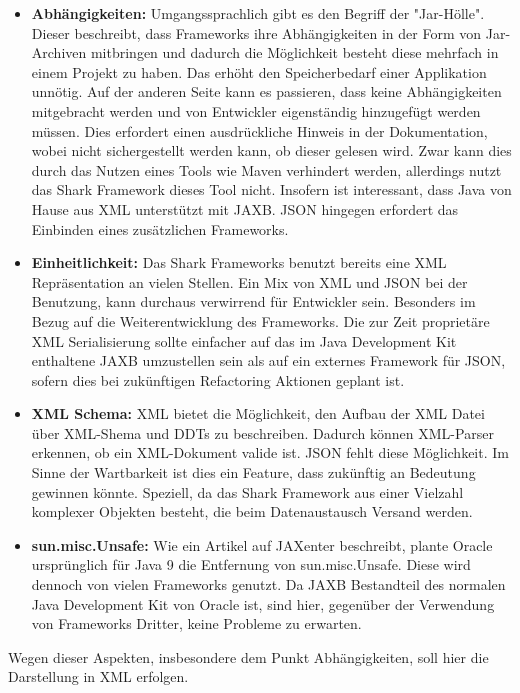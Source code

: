 \documentclass[a4paper]{article}
\begin{document}
	\begin{itemize}
		\item \textbf{Abhängigkeiten:} Umgangssprachlich gibt es den Begriff der
		"Jar-Hölle". Dieser beschreibt, dass Frameworks ihre Abhängigkeiten in der
		Form von Jar-Archiven mitbringen und dadurch die Möglichkeit besteht diese
		mehrfach in einem Projekt zu haben. Das erhöht den Speicherbedarf einer
		Applikation unnötig. Auf der anderen Seite kann es passieren, dass keine
		Abhängigkeiten mitgebracht werden und  von Entwickler eigenständig
		hinzugefügt werden müssen. Dies erfordert einen ausdrückliche Hinweis in
		der Dokumentation, wobei nicht sichergestellt werden kann, ob dieser
		gelesen	wird. Zwar kann dies durch das Nutzen eines Tools wie Maven
		verhindert werden, allerdings nutzt das Shark Framework dieses Tool nicht.
		Insofern ist interessant, dass Java von Hause aus XML unterstützt mit JAXB.
		JSON hingegen erfordert das Einbinden eines zusätzlichen Frameworks.
		\item \textbf{Einheitlichkeit:} Das Shark Frameworks benutzt bereits eine
		XML Repräsentation an vielen Stellen. Ein Mix von XML und JSON bei der
		Benutzung, kann durchaus verwirrend für Entwickler sein. Besonders
		im Bezug auf die Weiterentwicklung des Frameworks. Die zur Zeit proprietäre
		XML Serialisierung sollte einfacher auf das im Java Development Kit
		enthaltene JAXB umzustellen sein als auf ein externes Framework für JSON,
		sofern dies bei zukünftigen Refactoring Aktionen geplant ist.
		\item \textbf{XML Schema:} XML bietet die Möglichkeit, den
		Aufbau der XML Datei über XML-Shema und DDTs zu beschreiben. Dadurch
		können XML-Parser erkennen, ob ein XML-Dokument valide ist. JSON fehlt
		diese Möglichkeit. Im Sinne der Wartbarkeit ist dies ein Feature, dass
		zukünftig an Bedeutung gewinnen könnte. Speziell, da das Shark Framework
		aus einer Vielzahl komplexer Objekten besteht, die beim Datenaustausch
		Versand werden.
		\item \textbf{sun.misc.Unsafe:} Wie ein Artikel auf JAXenter \cite{unsafe}
		beschreibt, plante Oracle ursprünglich für Java 9 die Entfernung von
		sun.misc.Unsafe. Diese wird dennoch von vielen Frameworks genutzt. Da
		JAXB Bestandteil des normalen Java Development Kit von Oracle ist, sind
		hier, gegenüber der Verwendung von Frameworks Dritter, keine Probleme zu
		erwarten.
		
	\end{itemize} 	
	
	Wegen dieser Aspekten, insbesondere dem Punkt Abhängigkeiten, soll hier die
	Darstellung in XML erfolgen.
	
\end{document}
